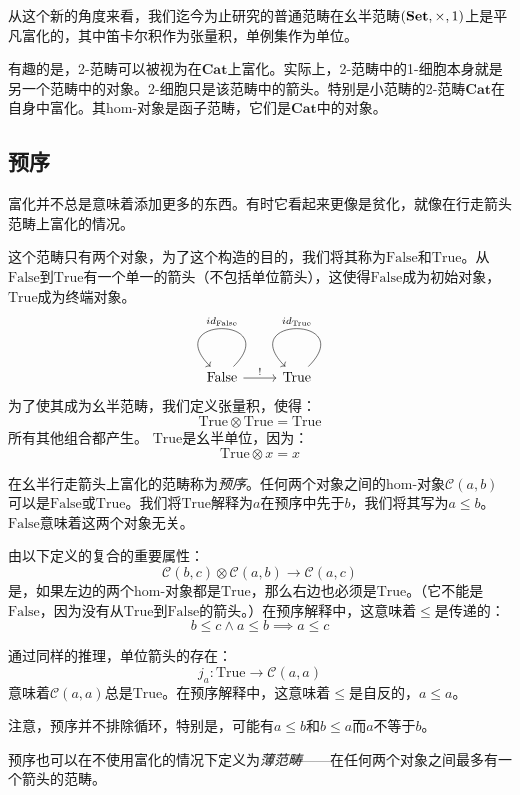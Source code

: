 \documentclass[DaoFP]{subfiles}
\begin{document}
从这个新的角度来看，我们迄今为止研究的普通范畴在幺半范畴$(\mathbf{Set}, \times, 1)$上是平凡富化的，其中笛卡尔积作为张量积，单例集作为单位。

有趣的是，2-范畴可以被视为在$\mathbf{Cat}$上富化。实际上，2-范畴中的1-细胞本身就是另一个范畴中的对象。2-细胞只是该范畴中的箭头。特别是小范畴的2-范畴$\mathbf{Cat}$在自身中富化。其hom-对象是函子范畴，它们是$\mathbf{Cat}$中的对象。

\subsection{预序}

富化并不总是意味着添加更多的东西。有时它看起来更像是贫化，就像在行走箭头范畴上富化的情况。

这个范畴只有两个对象，为了这个构造的目的，我们将其称为$\text{False}$和$\text{True}$。从$\text{False}$到$\text{True}$有一个单一的箭头（不包括单位箭头），这使得$\text{False}$成为初始对象，$\text{True}$成为终端对象。
\[
 \begin{tikzcd}
 \text{False}
 \arrow[r, "!"]
 \arrow[loop, "id_{\text{False}}"']
 & \text{True}
 \arrow[loop, "id_{\text{True}}"']
 \end{tikzcd}
\]
为了使其成为幺半范畴，我们定义张量积，使得：
\[ \text{True} \otimes \text{True} = \text{True} \]
所有其他组合都产生。
$\text{True}$是幺半单位，因为：
\[ \text{True} \otimes x = x \]

在幺半行走箭头上富化的范畴称为\emph{预序}。任何两个对象之间的hom-对象$\mathcal C (a, b)$可以是$\text{False}$或$\text{True}$。我们将$\text{True}$解释为$a$在预序中先于$b$，我们将其写为$a \le b$。$\text{False}$意味着这两个对象无关。

由以下定义的复合的重要属性：
\[ \mathcal C (b, c) \otimes \mathcal C (a, b) \to \mathcal C (a, c) \]
是，如果左边的两个hom-对象都是$\text{True}$，那么右边也必须是$\text{True}$。（它不能是$\text{False}$，因为没有从$\text{True}$到$\text{False}$的箭头。）在预序解释中，这意味着$\le$是传递的：
\[ b \le c \land a \le b \implies a \le c \]

通过同样的推理，单位箭头的存在：
\[ j_a \colon \text{True} \to \mathcal C(a, a) \]
意味着$\mathcal C(a, a)$总是$\text{True}$。在预序解释中，这意味着$\le$是自反的，$a \le a$。

注意，预序并不排除循环，特别是，可能有$a \le b$和$b \le a$而$a$不等于$b$。

预序也可以在不使用富化的情况下定义为\emph{薄范畴}——在任何两个对象之间最多有一个箭头的范畴。
\end{document}
